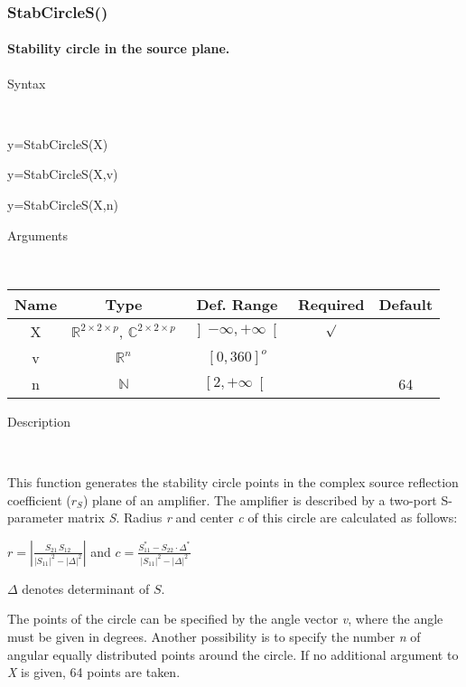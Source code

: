 \newpage
\subsubsection*{\hypertarget{StabCircleS}{}{\Large StabCircleS()}}


\paragraph{\label{par:StabCircleS}Stability circle in the source plane.}

\begin{description}
\item [Syntax]~
\end{description}
y=StabCircleS(X)

\noindent y=StabCircleS(X,v)

\noindent y=StabCircleS(X,n)

\begin{description}
\item [Arguments]~
\end{description}
\begin{tabular}{|c|c|c|c|c|}
\hline 
Name&
Type&
Def. Range&
Required&
Default\tabularnewline
\hline
\hline 
X&
$\mathbb{R}^{2\times2\times p}$, $\mathbb{C}^{2\times2\times p}$&
$\left]-\infty,+\infty\right[$&
$\surd$&
\tabularnewline
\hline
v&
$\mathbb{R}^{n}$&
$\left[0,360\right]^{o}$&
&
\tabularnewline
\hline
n&
$\mathbb{N}$&
$\left[2,+\infty\right[$&
&
64\tabularnewline
\hline
\end{tabular}

\begin{description}
\item [Description]~
\end{description}
This function generates the stability circle points in the complex
source reflection coefficient ($r_{S}$) plane of an amplifier. The
amplifier is described by a two-port S-parameter matrix \textit{S}.
Radius \textit{r} and center \textit{c} of this circle are calculated
as follows:

\medskip{}
\noindent $r={\displaystyle \left|\frac{S_{21}\, S_{12}}{\left|S_{11}\right|^{2}-\left|\Delta\right|^{2}}\right|}$
and $c={\displaystyle \frac{S_{11}^{*}-S_{22}\cdot\Delta^{*}}{\left|S_{11}\right|^{2}-\left|\Delta\right|^{2}}}$
\medskip{}

$\Delta$ denotes determinant of $S$.

\noindent The points of the circle can be specified by the angle vector
\textit{v}, where the angle must be given in degrees. Another possibility
is to specify the number \textit{n} of angular equally distributed
points around the circle. If no additional argument to \textit{X}
is given, 64 points are taken.


